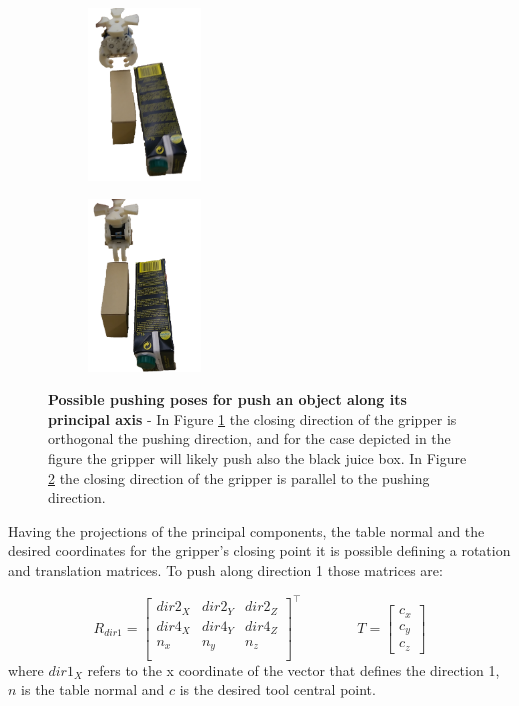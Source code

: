 \begin{figure}[h]
\centering
\begin{subfigure}[t]{0.45\textwidth}
\centering
\includegraphics[width=3cm]{Img/pushing/pushing333.png}
\caption{}\label{fig:pushing_way1}
\end{subfigure}
\begin{subfigure}[t]{0.45\textwidth}
\centering
\includegraphics[width=3cm]{Img/pushing/pushing222.png}
\caption{}\label{fig:pushing_way2}
\end{subfigure}
\caption{\textbf{Possible pushing poses for push an object along its principal axis} - In Figure \ref{fig:pushing_way1} the closing direction of the gripper is orthogonal the pushing direction, and for the case depicted in the figure the gripper will likely push also the black juice box. In Figure \ref{fig:pushing_way2} the closing direction of the gripper is parallel to the pushing direction.}\label{fig:pushing_way}
\end{figure}

Having the projections of the principal components, the table normal and the desired coordinates for the gripper's closing point it is possible defining a rotation and translation matrices. To push along direction 1 those matrices are:

\begin{equation}
R_{dir1} =
\begin{bmatrix}
dir2_X & dir2_Y & dir2_Z \\
dir4_X & dir4_Y & dir4_Z \\
n_x & n_y & n_z \\
\end{bmatrix}^{\top}
\qquad \qquad
T=
\begin{bmatrix}
c_x \\ c_y \\ c_z
\end{bmatrix}
\label{eq:transform}
\end{equation}
where $dir1_X$ refers to the x coordinate of the vector that defines the direction 1, $n$ is the table normal and $c$ is the desired tool central point. 

